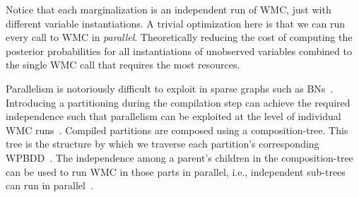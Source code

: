 Notice that each marginalization is an independent run of WMC, just with different variable instantiations. A trivial optimization here is that we can run every call to WMC in \emph{parallel}. Theoretically reducing the cost of computing the posterior probabilities for all instantiations of unobserved variables combined to the single WMC call that requires the most resources.

Parallelism is notoriously difficult to exploit in sparse graphs such as BNs~\cite{dal2014fast}. Introducing a partitioning during the compilation step can achieve the required independence such that parallelism can be exploited at the level of individual WMC runs~\cite{dal2017reducing}. Compiled partitions are composed using a composition-tree. This tree is the structure by which we traverse each partition's corresponding WPBDD~\cite{dal2021compositional}. The independence among a parent's children in the composition-tree can be used to run WMC in those parts in parallel, i.e., independent sub-trees can run in parallel~\cite{dal2018parallel}.


